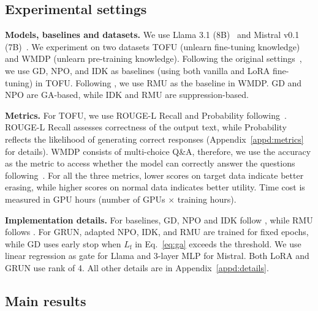 \subsection{Experimental settings}
\label{sec:settings}

\noindent\textbf{Models, baselines and datasets.} We use Llama 3.1 (8B)~\cite{dubey2024llama} and Mistral v0.1 (7B)~\cite{jiang2023mistral}. We experiment on two datasets TOFU (unlearn fine-tuning knowledge) and WMDP (unlearn pre-training knowledge). Following the original settings~\cite{maini2024tofu}, we use GD, NPO, and IDK as baselines (using both vanilla and LoRA fine-tuning) in TOFU. Following \citet{liwmdp}, we use RMU as the baseline in WMDP.
GD and NPO are GA-based, while IDK and RMU are suppression-based.

\noindent\textbf{Metrics.} For TOFU, we use ROUGE-L Recall and Probability following~\citet{maini2024tofu}. ROUGE-L Recall assesses correctness of the output text, while Probability reflects the likelihood of generating correct responses (Appendix~\ref{appd:metrics} for details). WMDP consists of multi-choice Q\&A, therefore, we use the accuracy as the metric to access whether the model can correctly answer the questions following~\citet{liwmdp}. For all the three metrics, lower scores on target data indicate better erasing, while higher scores on normal data indicates better utility.
Time cost is measured in GPU hours (number of GPUs $\times$ training hours).

\noindent\textbf{Implementation details.} 
For baselines, GD, NPO and IDK follow \citet{fan2024simplicity}, while RMU follows \citet{liwmdp}. For GRUN, adapted NPO, IDK, and RMU are trained for fixed epochs, while GD uses early stop when $L_{\text{f}}$ in Eq.~\eqref{eq:ga} exceeds the threshold. We use linear regression as gate for Llama and 3-layer MLP for Mistral.
Both LoRA and GRUN use rank of 4. All other details are in Appendix~\ref{appd:details}. 


\subsection{Main results}
\label{exp:main}


